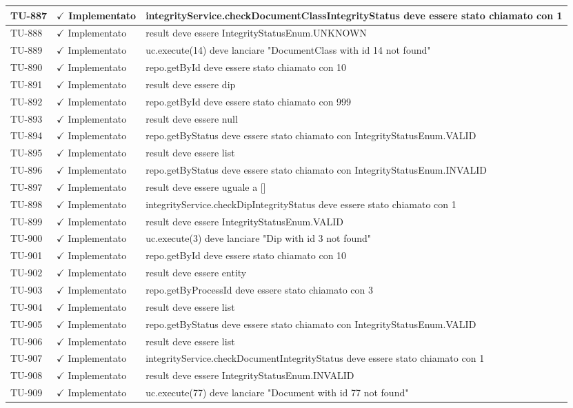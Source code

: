 ﻿\documentclass[a4paper,12pt]{article}
\newcommand{\ok}{\textcolor{green!60!black}{$\checkmark$ Implementato}}
\begin{document}
\begin{longtable}{|p{2cm}|p{3.5cm}|p{9.5cm}|}
\hline
TU-887 & \ok & integrityService.checkDocumentClassIntegrityStatus deve essere stato chiamato con 1 \\
\hline
TU-888 & \ok & result deve essere IntegrityStatusEnum.UNKNOWN \\
\hline
TU-889 & \ok & uc.execute(14) deve lanciare "DocumentClass with id 14 not found" \\
\hline
TU-890 & \ok & repo.getById deve essere stato chiamato con 10 \\
\hline
TU-891 & \ok & result deve essere dip \\
\hline
TU-892 & \ok & repo.getById deve essere stato chiamato con 999 \\
\hline
TU-893 & \ok & result deve essere null \\
\hline
TU-894 & \ok & repo.getByStatus deve essere stato chiamato con IntegrityStatusEnum.VALID \\
\hline
TU-895 & \ok & result deve essere list \\
\hline
TU-896 & \ok & repo.getByStatus deve essere stato chiamato con IntegrityStatusEnum.INVALID \\
\hline
TU-897 & \ok & result deve essere uguale a [] \\
\hline
TU-898 & \ok & integrityService.checkDipIntegrityStatus deve essere stato chiamato con 1 \\
\hline
TU-899 & \ok & result deve essere IntegrityStatusEnum.VALID \\
\hline
TU-900 & \ok & uc.execute(3) deve lanciare "Dip with id 3 not found" \\
\hline
TU-901 & \ok & repo.getById deve essere stato chiamato con 10 \\
\hline
TU-902 & \ok & result deve essere entity \\
\hline
TU-903 & \ok & repo.getByProcessId deve essere stato chiamato con 3 \\
\hline
TU-904 & \ok & result deve essere list \\
\hline
TU-905 & \ok & repo.getByStatus deve essere stato chiamato con IntegrityStatusEnum.VALID \\
\hline
TU-906 & \ok & result deve essere list \\
\hline
TU-907 & \ok & integrityService.checkDocumentIntegrityStatus deve essere stato chiamato con 1 \\
\hline
TU-908 & \ok & result deve essere IntegrityStatusEnum.INVALID \\
\hline
TU-909 & \ok & uc.execute(77) deve lanciare "Document with id 77 not found" \\

\end{longtable}
\end{document}
